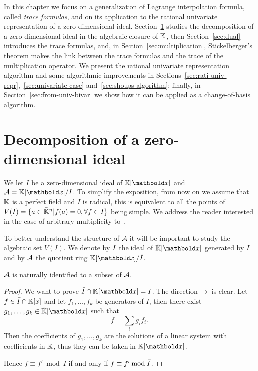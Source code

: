 In this chapter we focus on a generalization of
\hyperref[sec:chin-rema-algor]{Lagrange interpolation formula}, called
\emph{trace formulas}, and on its application to the rational
univariate representation of a zero-dimensional
ideal. Section~\ref{sec:decomp-zero-dimens} studies the decomposition
of a zero dimensional ideal in the algebraic closure of $\mathbb{K}$, then
Section~\ref{sec:dual} introduces the trace formulas, and, in
Section~\ref{sec:multiplication}, Stickelberger's theorem makes the
link between the trace formulas and the trace of the multiplication
operator. We present the rational univariate representation algorithm
and some algorithmic improvements in
Sections~\ref{sec:rati-univ-repr},~\ref{sec:univariate-case}
and~\ref{sec:shoups-algorithm}; finally, in
Section~\ref{sec:from-univ-bivar} we show how it can be applied as a
change-of-basis algorithm.


\section{Decomposition of a zero-dimensional ideal}
\label{sec:decomp-zero-dimens}

We let $I$ be a zero-dimensional ideal of $\K[\lst{x}]$ and
$\algeb{A}=\K[\lst{x}]/I$.  To simplify the exposition, from now on we
assume that $\mathbb{K}$ is a perfect field and $I$ is radical, this is
equivalent to all the points of $V(I)=\{a\in\bar{\mathbb{K}}^n|f(a)=0,
\forall f\in I\}$ being simple. We address the reader interested in
the case of arbitrary multiplicity to~\cite{mourrain+elkadi}.

To better understand the structure of $\mathcal{A}$ it will be important
to study the algebraic set $V(I)$. We denote by $\bar{I}$ the ideal of
$\clot{\K}[\lst{x}]$ generated by $I$ and by $\bar{\mathcal{A}}$ the
quotient ring $\clot{\K}[\lst{x}]/\clot{I}$.

\begin{lemma}
  $\mathcal{A}$ is naturally identified to a subset of $\bar{\mathcal{A}}$.
\end{lemma}
\begin{proof}
  We want to prove $\clot{I}\cap\K[\lst{x}]=I$. The direction
  $\supset$ is clear. Let $f\in\bar{I}\cap\mathbb{K}[x]$ and let
  $f_1,\ldots,f_k$ be generators of $I$, then there exist
  $g_1,\ldots,g_k\in\clot{\K}[\lst{x}]$ such that
  \begin{equation}
    \label{eq:114}
    f = \sum_i g_if_i
    \text{.}
  \end{equation}
  Then the coefficients of $g_1,\ldots,g_k$ are the solutions of a
  linear system with coefficients in $\mathbb{K}$, thus they can be taken in
  $\K[\lst{x}]$.

  Hence $f\equiv f'\bmod I$ if and only if $f\equiv f'\bmod\bar{I}$.
\end{proof}

